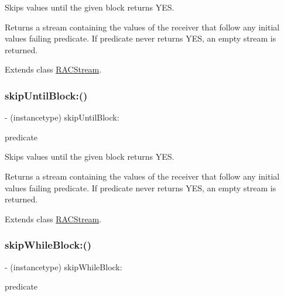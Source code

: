 Skips values until the given block returns {\ttfamily Y\+ES}.

Returns a stream containing the values of the receiver that follow any initial values failing {\ttfamily predicate}. If {\ttfamily predicate} never returns {\ttfamily Y\+ES}, an empty stream is returned. 

Extends class \mbox{\hyperlink{interface_r_a_c_stream_a008935d03ebc55b40b461dc080cddd38}{R\+A\+C\+Stream}}.

\mbox{\label{category_r_a_c_stream_07_operations_08_a008935d03ebc55b40b461dc080cddd38}} 
\subsubsection{\texorpdfstring{skip\+Until\+Block\+:()}{skipUntilBlock:()}\hspace{0.1cm}{\footnotesize\ttfamily [3/3]}}
{\footnotesize\ttfamily -\/ (instancetype) skip\+Until\+Block\+: \begin{DoxyParamCaption}\item[{(B\+O\+OL($^\wedge$)(id x))}]{predicate }\end{DoxyParamCaption}}

Skips values until the given block returns {\ttfamily Y\+ES}.

Returns a stream containing the values of the receiver that follow any initial values failing {\ttfamily predicate}. If {\ttfamily predicate} never returns {\ttfamily Y\+ES}, an empty stream is returned. 

Extends class \mbox{\hyperlink{interface_r_a_c_stream_a008935d03ebc55b40b461dc080cddd38}{R\+A\+C\+Stream}}.

\mbox{\label{category_r_a_c_stream_07_operations_08_a1e323c308071aed5e01627d4d96ca9c8}} 
\subsubsection{\texorpdfstring{skip\+While\+Block\+:()}{skipWhileBlock:()}\hspace{0.1cm}{\footnotesize\ttfamily [1/3]}}
{\footnotesize\ttfamily -\/ (instancetype) skip\+While\+Block\+: \begin{DoxyParamCaption}\item[{(B\+O\+OL($^\wedge$)(id x))}]{predicate }\end{DoxyParamCaption}}

